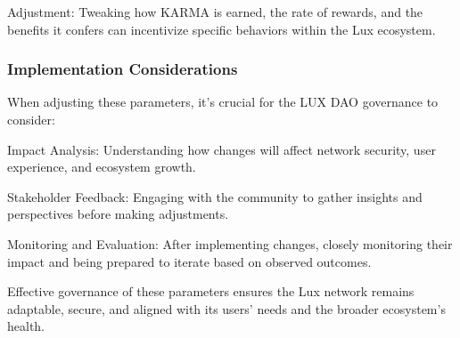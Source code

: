 \documentclass[11pt]{article}
\begin{document}
Adjustment: Tweaking how KARMA is earned, the rate of rewards, and the benefits it confers can incentivize specific behaviors within the Lux ecosystem.


\subsubsection{Implementation Considerations}

When adjusting these parameters, it's crucial for the LUX DAO governance to consider:


Impact Analysis: Understanding how changes will affect network security, user experience, and ecosystem growth.


Stakeholder Feedback: Engaging with the community to gather insights and perspectives before making adjustments.


Monitoring and Evaluation: After implementing changes, closely monitoring their impact and being prepared to iterate based on observed outcomes.


Effective governance of these parameters ensures the Lux network remains adaptable, secure, and aligned with its users' needs and the broader ecosystem's health.
\end{document}
